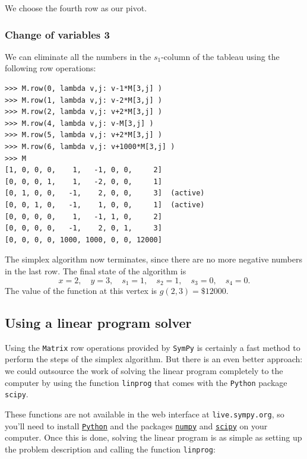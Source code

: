 \documentclass[11pt,oneside]{article}
\begin{document}
	\noindent
	We choose the fourth row as our pivot.

	\subsubsection{Change of variables 3}	
	We can eliminate all the numbers in the $s_1$-column of the tableau
	using the following row operations:

\begin{verbatim}
>>> M.row(0, lambda v,j: v-1*M[3,j] )
>>> M.row(1, lambda v,j: v-2*M[3,j] )
>>> M.row(2, lambda v,j: v+2*M[3,j] )
>>> M.row(4, lambda v,j: v-M[3,j] )
>>> M.row(5, lambda v,j: v+2*M[3,j] )
>>> M.row(6, lambda v,j: v+1000*M[3,j] )
>>> M
[1, 0, 0, 0,    1,   -1, 0, 0,     2]
[0, 0, 0, 1,    1,   -2, 0, 0,     1]
[0, 1, 0, 0,   -1,    2, 0, 0,     3]  (active)
[0, 0, 1, 0,   -1,    1, 0, 0,     1]  (active)
[0, 0, 0, 0,    1,   -1, 1, 0,     2]
[0, 0, 0, 0,   -1,    2, 0, 1,     3]
[0, 0, 0, 0, 1000, 1000, 0, 0, 12000]
\end{verbatim}

	\noindent
	The simplex algorithm now terminates,
	since there are no more negative numbers in the last row.
	The final state of the algorithm is 
	\[
		x=2, \quad y=3, \quad s_1=1, \quad s_2=1,  \quad s_3=0, \quad s_4=0.
	\]	
	The value of the function at this vertex is $g(2,3)= \$12000$.
	





	
	\subsection{Using a linear program solver}

		Using the \texttt{Matrix} row operations provided by \texttt{SymPy} is certainly a fast 
		method to perform the steps of the simplex algorithm.
		But there is an even better approach:
		we could outsource the work of solving the linear program 
		completely to the computer by using the function \texttt{linprog}
		that comes with the \texttt{Python} package \texttt{scipy}.
		
		These functions are not available in the web interface at \texttt{live.sympy.org},
		so you'll need to install \href{https://www.python.org/downloads/}{\texttt{Python}} 
		and the packages \href{http://www.scipy.org/install.html}{\texttt{numpy}}
		and \href{http://www.scipy.org/install.html}{\texttt{scipy}} on your computer.
		Once this is done, solving the linear program is as simple as 
		setting up the problem description and calling the function \texttt{linprog}:
		
\end{document}
